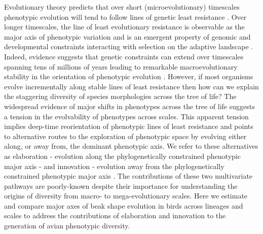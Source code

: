 \documentclass[12pt,letterpaper]{article}
\begin{document}
Evolutionary theory predicts that over short (microevolutionary) timescales phenotypic evolution will tend to follow lines of genetic least resistance \cite{schluter1996adaptive}.
Over longer timescales, the line of least evolutionary resistance is observable as the major axis of phenotypic variation \cite{marroig2005size,fasanelli2022allometry} and is an emergent property of genomic and developmental constraints interacting with selection on the adaptive landscape \cite{jones2004evolution}.
Indeed, evidence suggests that genetic constraints can extend over timescales spanning tens of millions of years leading to remarkable macroevolutionary stability in the orientation of phenotypic evolution \cite{mcglothlin2018adaptive}.
However, if most organisms evolve incrementally along stable lines of least resistance then how can we explain the staggering diversity of species morphologies across the tree of life? The widespread evidence of major shifts in phenotypes across the tree of life \cite{pagel2022general,cooney2017mega,venditti2011multiple,khabbazian2016fast,smaers2021evolution} suggests a tension in the evolvability of phenotypes across scales.
This apparent tension implies deep-time reorientation of phenotypic lines of least resistance and points to alternative routes to the exploration of phenotypic space by evolving either along, or away from, the dominant phenotypic axis.
We refer to these alternatives as elaboration - evolution along the phylogenetically constrained phenotypic major axis - and innovation - evolution away from the phylogenetically constrained phenotypic major axis \cite{endler2005animal}.
The contributions of these two multivariate pathways are poorly-known despite their importance for understanding the origins of diversity from macro- to mega-evolutionary scales.
Here we estimate and compare major axes of beak shape evolution in birds across lineages and scales to address the contributions of elaboration and innovation to the generation of avian phenotypic diversity.
\end{document}
